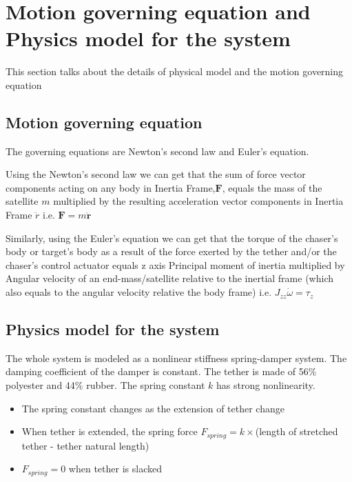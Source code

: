 \section{Motion governing equation and Physics model for the system}

This section talks about the details of physical model and the motion governing equation

\subsection{Motion governing equation}

The governing equations are Newton's second law and Euler's equation.

Using the Newton's second law we can get that the sum of force vector components acting on any body in Inertia Frame,$\mathbf{F}$, equals the mass of the satellite $m$ multiplied by the resulting acceleration vector components in Inertia Frame $\ddot{r}$ i.e. $ \mathbf{F} = m\mathbf{\ddot{r}}$

Similarly, using the Euler's equation we can get that the torque of the chaser's body or target's body as a result of the force exerted by the tether and/or the chaser's control actuator equals z axis Principal moment of inertia multiplied by Angular velocity of an end-mass/satellite relative to the inertial frame (which also equals to the angular velocity relative the body frame) i.e. $J_{zz} \dot{\omega} = \tau_z$ 

\subsection{Physics model for the system}

The whole system is modeled as a nonlinear stiffness spring-damper system. The damping coefficient of the damper is constant. The tether is made of 56\% polyester and 44\% rubber. The spring constant $k$ has strong nonlinearity. 

\begin{itemize}

\item The spring constant changes as the extension of tether change 

\item When tether is extended, the spring force $F_{spring} = k\times $(length of stretched tether - tether natural length)

\item $F_{spring} = 0$ when tether is slacked

\end{itemize}

